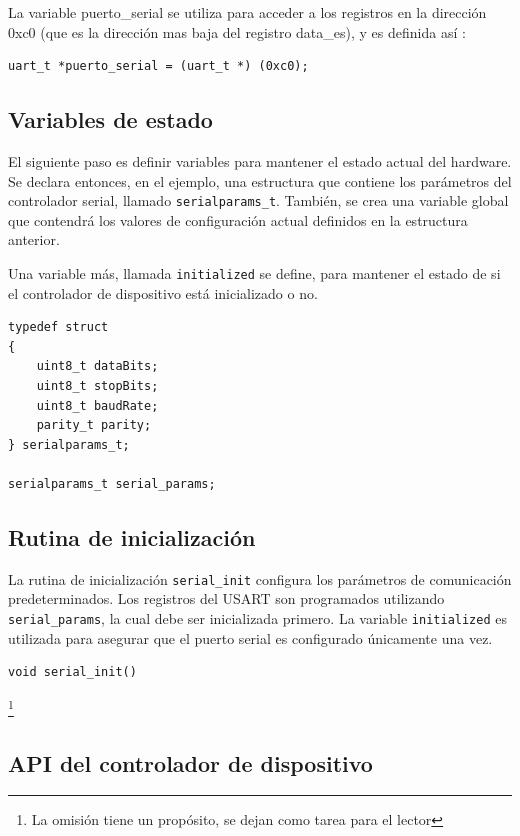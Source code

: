 \documentclass[output=paper, 
colorlinks,
citecolor=brown,
newtxmath
]{langscibook}
\begin{document}
La variable puerto\_serial se utiliza para acceder a los registros
en la dirección 0xc0 (que es la dirección mas baja del registro data\_es),
y es definida así :

\begin{verbatim}
uart_t *puerto_serial = (uart_t *) (0xc0);
\end{verbatim}


\subsection {Variables de estado}

El siguiente paso es definir variables para mantener el estado actual
del hardware. Se declara entonces, en el ejemplo, una estructura
que contiene los parámetros del controlador serial, llamado \texttt{serialparams\_t}.
También, se crea una variable global que contendrá los valores 
de configuración actual definidos en la estructura anterior.

Una variable más, llamada \texttt{initialized} se define, para mantener el estado 
de si el 
controlador de dispositivo está inicializado o no.

\begin{verbatim}
typedef struct
{
    uint8_t dataBits;
    uint8_t stopBits;
    uint8_t baudRate;
    parity_t parity;
} serialparams_t;

serialparams_t serial_params;
\end{verbatim}


\subsection {Rutina de inicialización}

La rutina de inicialización \texttt{serial\_init} configura los parámetros de comunicación
predeterminados.
Los registros del USART son programados utilizando \texttt{serial\_params}, la cual
debe ser inicializada primero.
La variable \texttt{initialized} es utilizada para asegurar que el puerto
serial es configurado únicamente una vez.


\begin{verbatim}
void serial_init()
\end{verbatim}
\footnote{La omisión tiene un propósito, se dejan como tarea para el lector}


\subsection {API del controlador de dispositivo}
\end{document}
